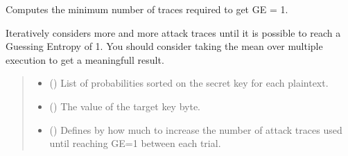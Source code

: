 \documentclass[letterpaper,10pt,english]{sphinxmanual}
\begin{document}
\begin{fulllineitems}
\begin{fulllineitems}
\begin{quote}
\begin{description}
\end{description}\end{quote}

\end{fulllineitems}


\begin{fulllineitems}
\label{\detokenize{MLSCAlib.Attacks:MLSCAlib.Attacks.profiled.Profiled.get_min_trace_for_GE1}}
\pysigstartsignatures
{}
\pysigstopsignatures
\sphinxAtStartPar
Computes the minimum number of traces required to get GE = 1.

\sphinxAtStartPar
Iteratively considers more and more attack traces until it is possible
to reach a Guessing Entropy of 1. You should consider taking the mean
over multiple execution to get a meaningfull result.
\begin{quote}\begin{description}
\begin{itemize}
\item {} 
\sphinxAtStartPar
{} (\sphinxstyleliteralemphasis{\sphinxupquote{{[}}}\sphinxstyleliteralemphasis{\sphinxupquote{{[}}}\sphinxstyleliteralemphasis{\sphinxupquote{{]}}}\sphinxstyleliteralemphasis{\sphinxupquote{{]}}}) \textendash{} List of probabilities sorted on the secret key for each plaintext.

\item {} 
\sphinxAtStartPar
{} () \textendash{} The value of the target key byte.

\item {} 
\sphinxAtStartPar
{} (\sphinxstyleliteralemphasis{\sphinxupquote{, }}) \textendash{} Defines by how much to increase the number of attack traces used until reaching GE=1
between each trial.


\end{itemize}
\end{description}
\end{quote}
\end{fulllineitems}
\end{fulllineitems}
\end{document}
